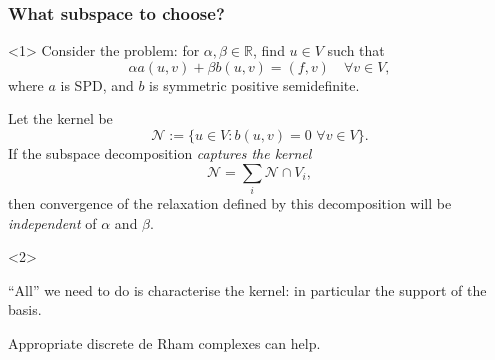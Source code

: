 \documentclass[presentation,aspectratio=43, 10pt]{beamer}
\begin{document}
\begin{frame}
  \frametitle{What subspace to choose?}
  \begin{onlyenv}<1> Consider the problem: for
    $\alpha, \beta \in \mathbb{R}$, find $u \in V$ such that
    \begin{equation*}
      \alpha a(u, v) + \beta b(u, v) = (f, v) \quad \forall v \in V,
    \end{equation*}
    where $a$ is SPD, and $b$ is symmetric positive semidefinite.
  \end{onlyenv}
  \begin{theorem}
    \small
    Let the kernel be
    \begin{equation*}
      \mathcal{N} := \{ u \in V : b(u, v) = 0 \,\, \forall v \in V \}.
    \end{equation*}
    If the subspace decomposition \emph{captures the kernel}
    \begin{equation*}
      \mathcal{N} = \sum_i \mathcal{N} \cap V_i,
    \end{equation*}
    then convergence of the relaxation defined by this decomposition
    will be \emph{independent} of $\alpha$ and $\beta$.
    \nocite{Schoeberl:1999,Lee:2007}
  \end{theorem}
  \begin{onlyenv}<2>
    \begin{corollary}
      \small
      ``All'' we need to do is characterise the kernel: in particular
      the support of the basis.

      Appropriate discrete de Rham complexes can help.
    \end{corollary}
  \end{onlyenv}
\end{frame}
\end{document}
